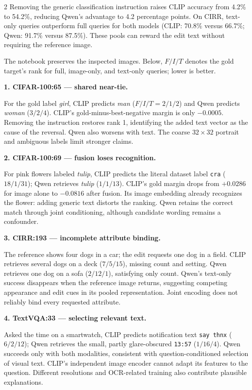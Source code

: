 \documentclass[10pt,letterpaper]{article}
\newcommand{\heading}[1]{\par\addvspace{5pt}\noindent{\normalsize\bfseries #1}\par\nobreak}
\newcommand{\case}[1]{\par\addvspace{4pt}\noindent\textbf{#1}\par\nobreak}
\begin{document}
\begin{multicols}{2}
Removing the generic classification instruction raises CLIP accuracy from 4.2\%
to 54.2\%, reducing Qwen's advantage to 4.2 percentage points. On CIRR, text-only
queries outperform full queries for both models (CLIP: 70.8\% versus 66.7\%;
Qwen: 91.7\% versus 87.5\%). These pools can reward the edit text without requiring
the reference image.

\heading{3. Five failure cases}
The notebook preserves the inspected images. Below, $F/I/T$ denotes the gold
target's rank for full, image-only, and text-only queries; lower is better.

\case{1. CIFAR-100:65 --- shared near-tie.}
For the gold label \emph{girl}, CLIP predicts \emph{man} ($F/I/T=2/1/2$) and
Qwen predicts \emph{woman} ($3/2/4$). CLIP's gold-minus-best-negative margin is
only $-0.0005$. Removing the instruction restores rank 1, identifying the added
text vector as the cause of the reversal. Qwen also worsens with text.
The coarse $32\times32$ portrait and ambiguous labels limit stronger claims.

\case{2. CIFAR-100:69 --- fusion loses recognition.}
For pink flowers labeled \emph{tulip}, CLIP predicts the literal dataset label
\texttt{cra} ($18/1/31$); Qwen retrieves \emph{tulip} ($1/1/13$). CLIP's gold
margin drops from $+0.0286$ for image alone to $-0.0816$ after fusion. Its image
embedding already recognizes the flower: adding generic text distorts the
ranking. Qwen retains the correct match through joint conditioning, although
candidate wording remains a confounder.

\case{3. CIRR:193 --- incomplete attribute binding.}
The reference shows four dogs in a car; the edit requests one dog in a field.
CLIP retrieves several dogs on a deck ($7/5/15$), missing count and setting.
Qwen retrieves one dog on a sofa ($2/12/1$), satisfying only count. Qwen's
text-only success disappears when the reference image returns, suggesting
competing appearance and edit cues in its pooled representation. Joint encoding
does not reliably bind every requested attribute.

\case{4. TextVQA:33 --- selecting relevant text.}
Asked the time on a smartwatch, CLIP predicts notification text \texttt{say thnx}
($6/2/12$); Qwen retrieves the small, partly glare-obscured \texttt{13:57}
($1/16/4$). Qwen succeeds only with both modalities, consistent with
question-conditioned selection of visual text. CLIP's independent image encoder
cannot adapt its features to the question. Different resolutions and OCR-related
training also contribute plausible explanations.


\end{multicols}
\end{document}
